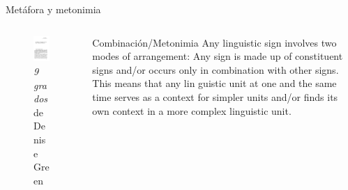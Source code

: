 \documentclass[presentation]{beamer}
\begin{document}
\begin{frame}[label={sec:org4f06d5c}]{Metáfora y metonimia}
\begin{columns}
\begin{column}{0.48\columnwidth}
\begin{figure}
    \includegraphics[width=\textwidth]{./assets/cover_two_aspects.png}
\caption{\emph{9 grados} de Denise Green}
 \end{figure}
\end{column}

\begin{column}{0.48\columnwidth}
\tiny
   \begin{block}{Combinación/Metonimia}
Any linguistic sign involves two modes of arrangement:
Any sign is made up of constituent signs and/or
occurs only in combination with other signs. This means that any lin­
guistic unit at one and the same time serves as a context for simpler
units and/or finds its own context in a more complex linguistic unit.


\end{block}
\end{column}
\end{columns}
\end{frame}
\end{document}
